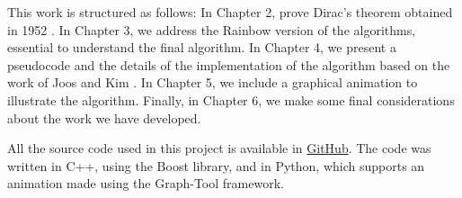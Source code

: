 This work is structured as follows: In Chapter 2, prove Dirac's theorem obtained in 1952 \cite{dirac1952}. In Chapter 3, we 
address the Rainbow version of the algorithms, essential to understand the final algorithm. In Chapter 4, 
we present a pseudocode and the details of the implementation of the algorithm based on the work of Joos and Kim \cite{Joos_2020}.
In Chapter 5, we include a graphical animation to illustrate the algorithm. 
Finally, in Chapter 6, we make some final considerations about the work we have developed.

All the source code used in this project is available in \href{https://github.com/wmrmrx/TCC}{GitHub}. The code was written in C++, using the Boost 
library, and in Python, which supports an animation made using the Graph-Tool framework.




